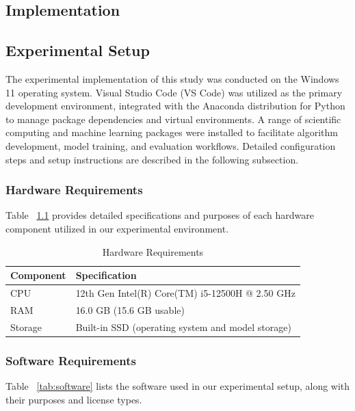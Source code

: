 \begin{ZhChapter}

    \chapter{Implementation}
    \section{Experimental Setup}
    The experimental implementation of this study was conducted on the Windows 11 operating system. Visual Studio Code (VS Code) was utilized as the primary development environment, integrated with the Anaconda distribution for Python to manage package dependencies and virtual environments. A range of scientific computing and machine learning packages were installed to facilitate algorithm development, model training, and evaluation workflows. Detailed configuration steps and setup instructions are described in the following subsection.

    \subsection{Hardware Requirements}

    Table~ \ref{table:hardware} provides detailed specifications and purposes of each hardware component utilized in our experimental environment.

    \begin{table}[htbp]
    \centering
    \caption{Hardware Requirements}
    \label{table:hardware}
    \begin{tabular}{|l|l|}
    \hline
    \textbf{Component} & \textbf{Specification} \\ \hline
    CPU & 12th Gen Intel(R) Core(TM) i5-12500H @ 2.50 GHz \\ \hline
    RAM & 16.0 GB (15.6 GB usable) \\ \hline
    Storage & Built-in SSD (operating system and model storage) \\ \hline
    \end{tabular}
    \end{table}

    \subsection{Software Requirements}

    Table~ \ref{tab:software} lists the software used in our experimental setup, along with their purposes and license types.


\end{ZhChapter}
